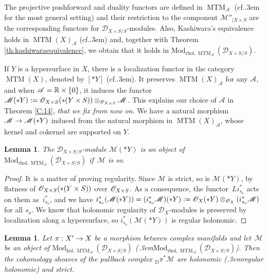\documentclass[english]{smfart}
\numberwithin{subsection}{section}
\def\sha{\mathcal{A}}\let\cA\sha
\def\shd{\mathcal{D}}\let\cD\shd
\def\shm{\mathcal{M}}
\newcommand{\hol}{\mathrm{hol}}
\newcommand{\rhol}{\mathrm{rhol}}
\newcommand{\Mod}{\mathrm{Mod}}
\newcommand{\XS}{X\times S}
\newcommand{\YS}{Y\times S}
\newcommand{\DXS}{\shd_{\XS/S}}
\DeclareMathOperator{\MTM}{MTM}
\def\cf{cf.\kern.3em}
\def\resp{\text{resp.}\kern.3em}
\newcommand{\Dpi}{{}_{\scriptscriptstyle\mathrm{D}}\pi}
\numberwithin{equation}{section}
\theoremstyle{plain}
\newtheorem{lemma}[equation]{Lemma}
\theoremstyle{definition}
\def\to{\mathchoice{\longrightarrow}{\rightarrow}{\rightarrow}{\rightarrow}}
\begin{document}
The projective pushforward and duality functors are defined in $\MTM_\sha$ (\cf\cite[\S7.2.2\,\&\,\S13.3]{Mochizuki11} for the most general setting) and their restriction to the component $\shm''_{|\XS}$ are the corresponding functors for $\DXS$-modules. Also, Kashiwara's equivalence holds in $\MTM(X)_\sha$ (\cf \cite[Prop.\,7.2.8]{Mochizuki11}) and, together with Theorem \ref{th:kashiwaraequivalence}, we obtain that it holds in $\Mod_{\rhol,\MTM_\sha}(\DXS)$.

If $Y$ is a hypersurface in $X$, there is a localization functor in the category $\MTM(X)$, denoted by $[*Y]$ (\cf\cite[\S11.2.2]{Mochizuki11}). It preserves $\MTM(X)_\sha$ for any $\sha$, and when $\sha=\RR\times\{0\}$, it induces the functor $\shm(*Y):=\cO_{\XS}(*(\YS))\otimes_{\cO_{\XS}}\shm$. This explains our choice of $\sha$ in Theorem \ref{C:14}, \emph{that we fix from now on}. We have a natural morphism $\shm\to\shm(*Y)$ induced from the natural morphism in $\MTM(X)_\sha$, whose kernel and cokernel are supported on $Y$.

\begin{lemma}\label{lem:locrholMTM}
The $\DXS$-module $\shm(*Y)$ is an object of $\Mod_{\rhol,\MTM_\sha}(\DXS)$ if~$\shm$ is so.
\end{lemma}

\begin{proof}
It is a matter of proving regularity. Since $\shm$ is strict, so is $\shm(*Y)$, by flatness of $\cO_{\XS}(*(\YS))$ over $\cO_{\XS}$. As a consequence, the functor~$Li_{s_o}^*$ acts on them as~$i_{s_o}^*$, and we have $i_{s_o}^*(\shm(*Y))=(i_{s_o}^*\shm)(*Y):=\cO_X(*Y)\otimes_{\cO_X}(i_{s_o}^*\shm)$ for all $s_o$. We know that holonomic regularity of $\shd_X$-modules is preserved by localization along a hypersurface, so $i_{s_o}^*(\shm(*Y))$ is regular holonomic.\end{proof}

\begin{lemma}\label{lem:pullbackrholMTM}
Let $\pi:X'\to X$ be a morphism between complex manifolds and let~$\shm$ be an object of $\Mod_{\hol,\MTM_\sha}(\DXS)$ (\resp $\Mod_{\rhol,\MTM_\sha}(\DXS)$). Then the cohomology sheaves of the pullback complex $\Dpi^*\shm$ are holonomic (\resp regular holonomic) and strict.
\end{lemma}
\end{document}

